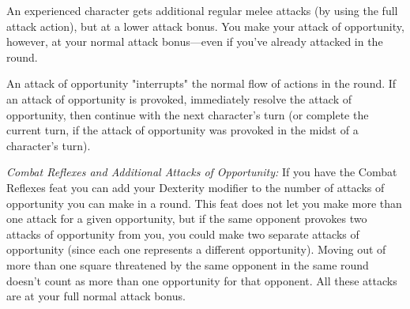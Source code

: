 An experienced character gets additional regular melee attacks (by using the full attack action), but at a lower attack bonus. You make your attack of opportunity, however, at your normal attack bonus---even if you've already attacked in the round.

An attack of opportunity "interrupts" the normal flow of actions in the round. If an attack of opportunity is provoked, immediately resolve the attack of opportunity, then continue with the next character's turn (or complete the current turn, if the attack of opportunity was provoked in the midst of a character's turn).

\textit{Combat Reflexes and Additional Attacks of Opportunity:} If you have the Combat Reflexes feat you can add your Dexterity modifier to the number of attacks of opportunity you can make in a round. This feat does not let you make more than one attack for a given opportunity, but if the same opponent provokes two attacks of opportunity from you, you could make two separate attacks of opportunity (since each one represents a different opportunity). Moving out of more than one square threatened by the same opponent in the same round doesn't count as more than one opportunity for that opponent. All these attacks are at your full normal attack bonus.